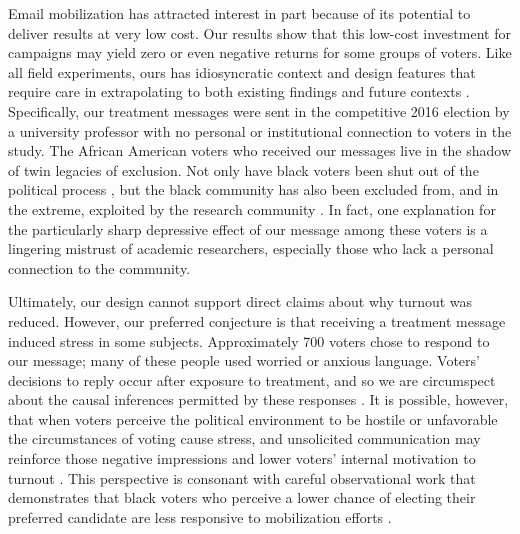 \documentclass[12pt]{article}
\begin{document}
Email mobilization has attracted interest in part because of its
potential to deliver results at very low cost. Our results show that
this low-cost investment for campaigns may yield zero or even negative
returns for some groups of voters. Like all field experiments, ours
has idiosyncratic context and design features that require care in
extrapolating to both existing findings and future contexts
\citep{bates2017generalizability}. Specifically, our treatment
messages were sent in the competitive 2016 election by a university
professor with no personal or institutional connection to voters in
the study. The African American voters who received our messages live
in the shadow of twin legacies of exclusion. Not only have black
voters been shut out of the political process \citep{dawson1995}, but
the black community has also been excluded from, and in the extreme,
exploited by the research community \citep{brandt1978}. In fact, one
explanation for the particularly sharp depressive effect of our
message among these voters is a lingering mistrust of academic
researchers, especially those who lack a personal connection to the
community.

Ultimately, our design cannot support direct claims about why turnout
was reduced. However, our preferred conjecture is that receiving a
treatment message induced stress in some subjects. Approximately 700
voters chose to respond to our message; many of these people used
worried or anxious language. Voters' decisions to reply occur after
exposure to treatment, and so we are circumspect about the causal
inferences permitted by these responses \citep{coppock2019}. It is
possible, however, that when voters perceive the political environment
to be hostile or unfavorable the circumstances of voting cause stress,
and unsolicited communication may reinforce those negative impressions
and lower voters' internal motivation to turnout
\citep{hassell2017}. This perspective is consonant with careful
observational work that demonstrates that black voters who perceive a
lower chance of electing their preferred candidate are less responsive
to mobilization efforts \citep{mcgowen2010}.
\end{document}
